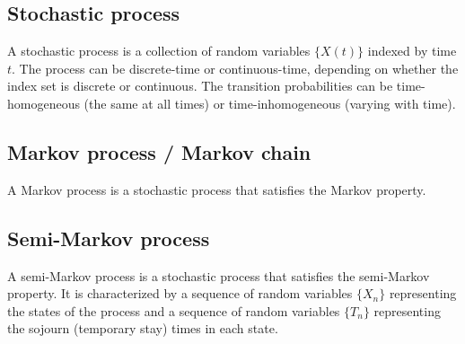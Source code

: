 \subsection{Stochastic process}

A stochastic process is a collection of random variables \( \{ X(t) \} \) indexed by time \( t \).
The process can be discrete-time or continuous-time, depending on whether the index set is discrete or continuous.
The transition probabilities can be time-homogeneous (the same at all times) or time-inhomogeneous (varying with time).

\subsection{Markov process / Markov chain}

A Markov process is a stochastic process that satisfies the Markov property.

\subsection{Semi-Markov process}

A semi-Markov process is a stochastic process that satisfies the semi-Markov property.
It is characterized by a sequence of random variables \( \{ X_n \} \) representing the states of the process and a sequence of random variables \( \{ T_n \} \) representing the sojourn (temporary stay) times in each state.
